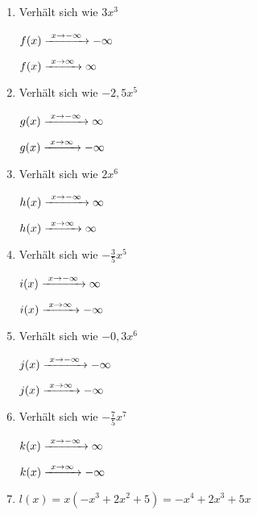 \begin{Answer}[ref=ganzVerA1]
	
	\begin{minipage}{\textwidth}
		\begin{minipage}[t]{0.5\textwidth}
			\begin{enumerate}[label=\alph*)]
				\item Verhält sich wie \(3x^3\)
				
				\(f(x)\xrightarrow{\hphantom{\ }x\to-\infty\hphantom{\ }}-\infty\)
				
				\(f(x)\xrightarrow{\hphantom{\ }x\to\infty\hphantom{\ }}\infty\)
				\item Verhält sich wie \(-2,5x^5\)
				
				\(g(x)\xrightarrow{\hphantom{\ }x\to-\infty\hphantom{\ }}\infty\)
				
				\(g(x)\xrightarrow{\hphantom{\ }x\to\infty\hphantom{\ }}-\infty\)
				\item Verhält sich wie \(2x^6\)
				
				\(h(x)\xrightarrow{\hphantom{\ }x\to-\infty\hphantom{\ }}\infty\)
				
				\(h(x)\xrightarrow{\hphantom{\ }x\to\infty\hphantom{\ }}\infty\)
				\item Verhält sich wie \(-\frac{3}{5}x^5\)
				
				\(i(x)\xrightarrow{\hphantom{\ }x\to-\infty\hphantom{\ }}\infty\)
				
				\(i(x)\xrightarrow{\hphantom{\ }x\to\infty\hphantom{\ }}-\infty\)
			\end{enumerate}
		\end{minipage}%
		\begin{minipage}[t]{0.5\textwidth}
			\begin{enumerate}[label=\alph*)]
				\setcounter{enumi}{4}
				\item Verhält sich wie \(-0,3x^6\)
				
				\(j(x)\xrightarrow{\hphantom{\ }x\to-\infty\hphantom{\ }}-\infty\)
				
				\(j(x)\xrightarrow{\hphantom{\ }x\to\infty\hphantom{\ }}-\infty\)
				\item Verhält sich wie \(-\frac{7}{5}x^7\)
				
				\(k(x)\xrightarrow{\hphantom{\ }x\to-\infty\hphantom{\ }}\infty\)
				
				\(k(x)\xrightarrow{\hphantom{\ }x\to\infty\hphantom{\ }}-\infty\)
				\item \(l(x)=x\left(-x^3+2x^2+5\right)=-x^4+2x^3+5x\)
				

\end{enumerate}
\end{minipage}
\end{minipage}
\end{Answer}
